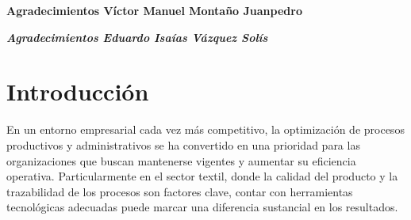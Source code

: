 \documentclass[12pt,letterpaper,spanish]{report}
\newenvironment{dedication}{\newpage\large\null\em\vskip1in}%
{\vfill}
\begin{document}
        \thispagestyle{empty}

        \begin{dedication}
%
%


    \textbf{Agradecimientos Víctor Manuel Montaño Juanpedro}

        \end{dedication}
\newpage
\begin{dedication}
  \textbf{Agradecimientos Eduardo Isaías Vázquez Solís}
\end{dedication}



\tableofcontents



\oddsidemargin 0.2in \textwidth 6.5in \topmargin -0.25in
\textheight 9in \pagestyle{myheadings}

\newpage



\chapter{Introducción}
\newpage


En un entorno empresarial cada vez más competitivo, la optimización de procesos productivos y administrativos se ha convertido en una prioridad para las organizaciones que buscan mantenerse vigentes y aumentar su eficiencia operativa. Particularmente en el sector textil, donde la calidad del producto y la trazabilidad de los procesos son factores clave, contar con herramientas tecnológicas adecuadas puede marcar una diferencia sustancial en los resultados.
\end{document}
